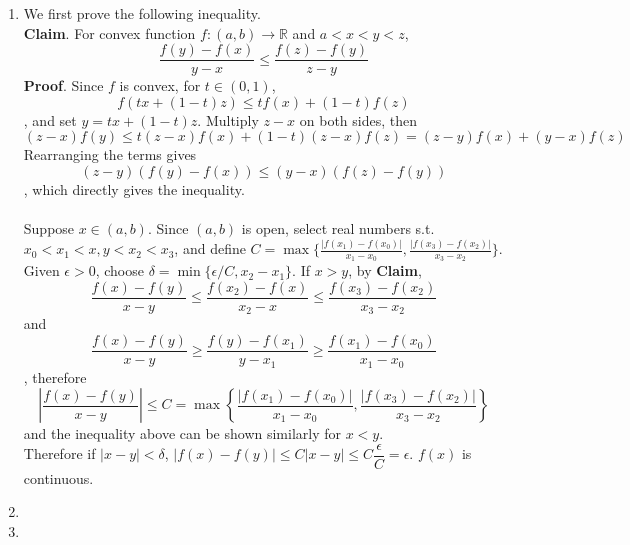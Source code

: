 \documentclass[11pt]{report}
\newcommand{\ra}{\rightarrow}
\newcommand{\abs}[1]{\left|#1\right|}
\newcommand{\R}{\mathbb{R}}
\begin{document}
\begin{enumerate}
\item We first prove the following inequality.\\
\textbf{Claim}. For convex function $f:(a, b)\ra \R$ and $a < x < y < z$, $$\frac{f(y) - f(x)}{y - x} \leq \frac{f(z) - f(y)}{z - y}$$
\textbf{Proof}. Since $f$ is convex, for $t\in (0, 1)$, $$f(tx +(1-t)z) \leq tf(x) + (1-t)f(z)$$, and set $y = tx + (1-t)z$. Multiply $z-x$ on both sides, then $$(z-x)f(y) \leq t(z-x)f(x) + (1-t)(z-x)f(z) = (z-y)f(x) + (y-x)f(z)$$
Rearranging the terms gives $$(z-y)(f(y)-f(x))\leq (y-x)(f(z)-f(y))$$
, which directly gives the inequality.\\
\\
Suppose $x\in (a, b)$. Since $(a, b)$ is open, select real numbers s.t. $x_0 < x_1 < x, y < x_2 < x_3$, and define $C = \max\{\frac{\abs{f(x_1) - f(x_0)}}{x_1-x_0}, \frac{\abs{f(x_3) - f(x_2)}}{x_3-x_2} \}$. Given $\epsilon > 0$, choose $\delta = \min\{\epsilon/C, x_2 - x_1\}$. 
If $x > y$, by \textbf{Claim}, $$\frac{f(x) - f(y)}{x-y} \leq \frac{f(x_2) - f(x)}{x_2-x} \leq \frac{f(x_3) - f(x_2)}{x_3-x_2}$$
and
$$\frac{f(x) - f(y)}{x -y} \geq \frac{f(y) - f(x_1)}{y - x_1} \geq \frac{f(x_1) - f(x_0)}{x_1-x_0} $$, therefore $$\abs{\frac{f(x)-f(y)}{x - y}} \leq C = \max\left\{\frac{\abs{f(x_1) - f(x_0)}}{x_1-x_0}, \frac{\abs{f(x_3) - f(x_2)}}{x_3-x_2} \right\}$$
and the inequality above can be shown similarly for $x < y$.\\
Therefore if $\abs{x - y} <\delta$, $\abs{f(x) - f(y)} \leq C\abs{x - y} \leq C \dfrac{\epsilon}{C} =\epsilon$. $f(x)$ is continuous.
\item 

\item 
\end{enumerate}
\end{document}
